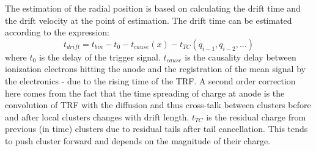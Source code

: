 \documentclass{alicetdr}
\begin{document}
The estimation of the radial position is based on calculating the drift time 
and the drift velocity at the point of estimation. The drift time can be 
estimated according to the expression:
\begin{equation}
t_{drift} = t_{bin} - t_{0} - t_{cause}(x) - t_{TC}(q_{i-1}, q_{i-2}, ...)
\end{equation}
where $t_0$ is the delay of the trigger signal. $t_{cause}$ is the causality 
delay between ionization electrons hitting the anode and the registration of 
the mean signal by the electronics - due to the rising time of the TRF. A 
second order correction here comes from the fact that the time spreading of 
charge at anode is the convolution of TRF with the diffusion and thus 
cross-talk between clusters before and after local clusters changes with drift 
length. $t_{TC}$ is the residual charge from previous (in time) clusters due 
to residual tails after tail cancellation. This tends to push cluster forward 
and depends on the magnitude of their charge.
\end{document}

